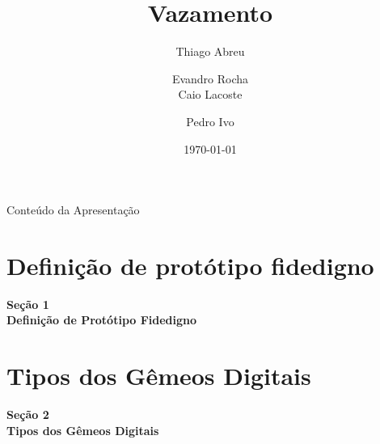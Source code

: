 \documentclass[aspectratio=169,xcolor=dvipsnames]{beamer}
\title{Vazamento}
\author{%
Thiago Abreu \and Evandro Rocha  \\%
Caio Lacoste \and Pedro Ivo %
}
\date{\today}
\institute{Laboratório de Processamento de Sinais (LPS)}
\begin{document}
\begin{frame}[plain]
    \titlepage
\end{frame}

\begin{frame}{Conteúdo da Apresentação}
    \tableofcontents
\end{frame}


\section{Definição de protótipo fidedigno}

\begin{frame}[plain]
    \vfill
    \centering
    {\Large\textcolor{dexpiBlue}{\textbf{Seção 1}}}\\[0.8em]
    {\LARGE\textbf{Definição de Protótipo Fidedigno}}\\[0.6em]
    \vfill
\end{frame}


\section{Tipos dos Gêmeos Digitais}

\begin{frame}[plain]
    \vfill
    \centering
    {\Large\textcolor{dexpiBlue}{\textbf{Seção 2}}}\\[0.8em]
    {\LARGE\textbf{Tipos dos Gêmeos Digitais}}\\[0.6em]
    \vfill
\end{frame}
\end{document}

